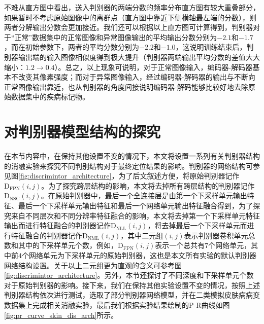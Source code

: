 不难从直方图中看出，送入判别器的两端分数的频率分布直方图有较大重叠部分，如果暂时不考虑原始图像中的离群点（直方图中靠近下侧横轴最左端的分数），则两者分解输出分数会更加接近。我们还可以根据以上直方图可计算得到，判别器对于“正常”数据集中的正常图像和异常图像输出的平均输出分数分别为$-2.1$和$-1.7$，而在初始参数下，两者的平均分数分别为$-2.2$和$-1.0$，这说明训练结束后，判别器输出端的输入图像相似度得到极大提升（判别器两端输出平均分数的差值大大缩小：$1.2\rightarrow 0.4$）。总之，以上现象可说明，对于正常图像输入，编码器-解码器基本不改变其像素强度；而对于异常图像输入，经过编码器-解码器的输出与不断向正常图像输出靠近，也从判别器的角度间接说明编码器-解码能够比较好地去除原始数据集中的疾病标记物。


\section{对判别器模型结构的探究}\label{sec:dis_arch}
在本节内容中，在保持其他设置不变的情况下，本文将设置一系列有关判别器结构的消融实验来探究不同判别结构对于最终定位结果的影响。判别器的网络结构可参见图\ref{fig:discrimintor_architecture}，为了后文叙述方便，将原始判别器记作$\mathrm{D}_\mathrm{FPN}(i,j)$。为了探究跨层结构的影响，本文将去掉所有跨层结构的判别器记作$\mathrm{D}_\mathrm{NSC}(i,j)$。在原始判别器中，最后一个全连接层是由第一个下采样单元输出特征、最后一个下采样单元输出特征和最后一个网络单元输出特征融合得到，为了探究来自不同层次和不同分辨率特征融合的影响，本文将去掉第一个下采样单元特征输出而进行特征融合的判别器记作$\mathrm{D}_\mathrm{NLL}(i,j)$，将去掉最后一个下采样单元而进行特征融合的判别器记作$\mathrm{D}_\mathrm{NML}(i,j)$，其中二元组$(i,j)$表示判别器卷积单元总数和其中的下采样单元个数，例如，$\mathrm{D}_\mathrm{FPN}(i,j)$表示一个总共有$7$个网络单元，其中前$4$个网络单元为下采样单元的原始判别器，这也是本文所有实验的默认判别器网络结构设置。关于以上二元组更为直观的含义可参考图\ref{fig:discrimintor_architecture}。另外，本节还探讨了不同深度和下采样单元个数对于原始判别器的影响。接下来，我们在保持其他实验设置不变的情况，按照上述判别器结构依次进行测试，选取了部分判别器网络模型，并在二类模拟皮肤病病变数据集上完成相关消融实验，最后我们根据实验结果绘制的P-R曲线如图\ref{fig:pr_curve_skin_dis_arch}所示。

